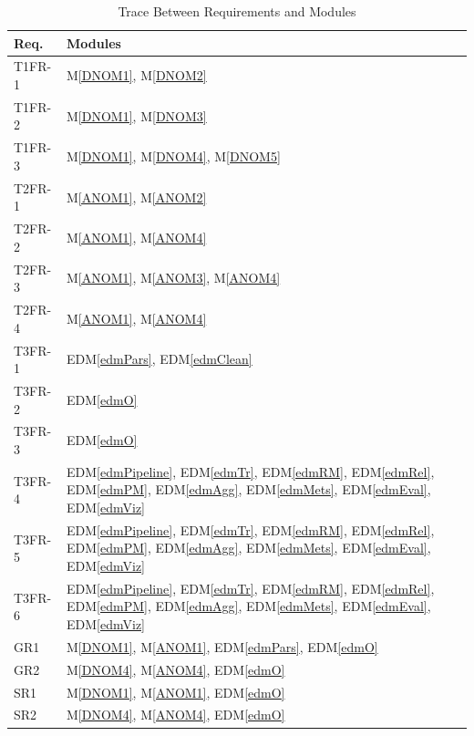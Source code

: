 \documentclass[12pt, titlepage]{article}
\newcommand{\mref}[1]{M\ref{#1}}
\newcommand{\edmref}[1]{EDM\ref{#1}}
\begin{document}
\begin{table}[H]
\centering
\begin{tabular}{p{} p{}}
\toprule
\textbf{Req.} & \textbf{Modules}\\
\midrule
T1FR-1 & \mref{DNOM1}, \mref{DNOM2}\\
T1FR-2 & \mref{DNOM1}, \mref{DNOM3}\\
T1FR-3 & \mref{DNOM1}, \mref{DNOM4}, \mref{DNOM5}\\
T2FR-1 & \mref{ANOM1}, \mref{ANOM2}\\
T2FR-2 & \mref{ANOM1}, \mref{ANOM4}\\
T2FR-3 & \mref{ANOM1}, \mref{ANOM3}, \mref{ANOM4}\\
T2FR-4 & \mref{ANOM1}, \mref{ANOM4}\\
T3FR-1 & \edmref{edmPars}, \edmref{edmClean}\\
T3FR-2 & \edmref{edmO}\\
T3FR-3 & \edmref{edmO}\\
T3FR-4 & \edmref{edmPipeline}, \edmref{edmTr}, \edmref{edmRM}, \edmref{edmRel}, \edmref{edmPM}, \edmref{edmAgg}, \edmref{edmMets}, \edmref{edmEval}, \edmref{edmViz}\\
T3FR-5 & \edmref{edmPipeline}, \edmref{edmTr}, \edmref{edmRM}, \edmref{edmRel}, \edmref{edmPM}, \edmref{edmAgg}, \edmref{edmMets}, \edmref{edmEval}, \edmref{edmViz}\\
T3FR-6 & \edmref{edmPipeline}, \edmref{edmTr}, \edmref{edmRM}, \edmref{edmRel}, \edmref{edmPM}, \edmref{edmAgg}, \edmref{edmMets}, \edmref{edmEval}, \edmref{edmViz}\\
GR1 & \mref{DNOM1}, \mref{ANOM1}, \edmref{edmPars}, \edmref{edmO}\\
GR2 & \mref{DNOM4}, \mref{ANOM4}, \edmref{edmO}\\
SR1 & \mref{DNOM1}, \mref{ANOM1}, \edmref{edmO}\\
SR2 & \mref{DNOM4}, \mref{ANOM4}, \edmref{edmO}\\

\bottomrule
\end{tabular}
\caption{Trace Between Requirements and Modules}
\label{TblRT}
\end{table}
\end{document}
